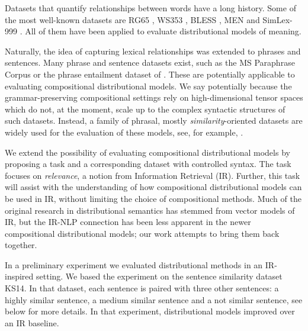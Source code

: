 Datasets that quantify relationships between words have a long history.\footnotemark{} Some of the most well-known datasets are RG65 \cite{Rubenstein:1965:CCS:365628.365657}, WS353 \cite{2002:PSC:503104.503110}, BLESS \cite{baroni-lenci:2011:GEMS}, MEN \cite{Bruni:2014:MDS:2655713.2655714} and SimLex-999 \cite{hill2014simlex}. All of them have been applied to evaluate distributional models of meaning.


Naturally, the idea of capturing lexical relationships was extended to phrases and sentences. Many phrase and sentence datasets exist, such as the MS Paraphrase Corpus \cite{dolan2005par} or the phrase entailment dataset of . These are potentially applicable to evaluating compositional distributional models. We say potentially because the grammar-preserving compositional settings \cite{baroni2014frege,DBLP:journals/corr/abs-1003-4394}  rely on high-dimensional tensor spaces which do not, at the moment, scale up to  the complex syntactic structures of such datasets. Instead, a family of phrasal, mostly \emph{similarity}-oriented datasets \cite{mitchell-lapata:2008:ACLMain,Grefenstette:2011:ESC:2145432.2145580,kartsaklis-sadrzadeh:2013:EMNLP,kartsadrqpl2014} are widely used for the evaluation of these models, see, for example, \citet{kim-demarneffe-foslerlussier:2015:VSM-NLP}.

We extend the possibility of evaluating compositional distributional models by proposing a task and a corresponding dataset  with controlled syntax. The task focuses on \emph{relevance}, a notion from Information Retrieval (IR).  Further, this task will assist with the understanding of how compositional distributional  models  can be used in IR, without limiting the choice of compositional methods. Much of the original research in distributional semantics has stemmed from vector models of IR, but the IR-NLP connection has been less apparent in  the newer compositional distributional models; our work attempts to bring them back together.

In a preliminary experiment \cite{Milajevs:2015:IMN:2808194.2809448} we evaluated distributional methods in an IR-inspired setting. We based the experiment on the sentence similarity dataset KS14. In that dataset, each sentence is paired with three other sentences: a highly similar sentence, a medium similar sentence and a not similar sentence, see below for more details. In that experiment, distributional models improved over an IR baseline.

